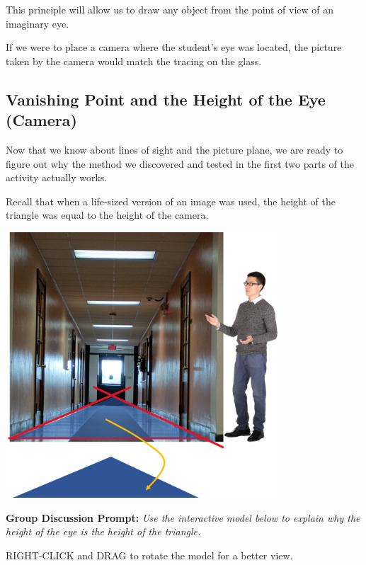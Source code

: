 \documentclass{ximera}
\begin{document}
This principle will allow us to draw any object from the point of view of an imaginary eye.

If we were to place a camera where the student's eye was located, the picture taken by the camera would match the tracing on the glass.

\subsection*{Vanishing Point and the Height of the Eye (Camera)}
Now that we know about lines of sight and the picture plane, we are ready to figure out why the method we discovered and tested in the first two parts of the activity actually works.

\begin{exploration}\label{exp:punchline}
Recall that when a life-sized version of an image was used, the height of the triangle was equal to the height of the camera.

\begin{image}
         \includegraphics[width=4in]{lifeSize.jpg}
\end{image}

\textbf{Group Discussion Prompt:}
\emph{Use the interactive model below to explain why the height of the eye is the height of the triangle.}

RIGHT-CLICK and DRAG to rotate the model for a better view.
\begin{center}
\end{center}
\end{exploration}
\end{document}
